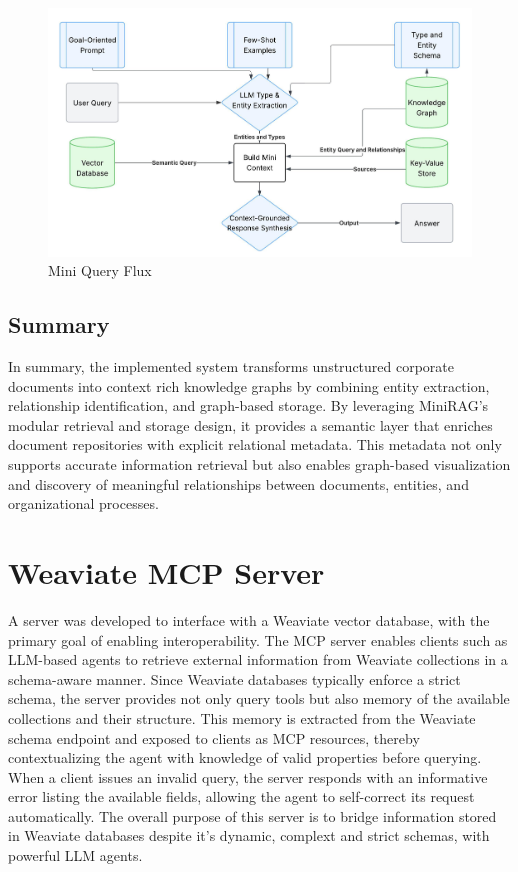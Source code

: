 \begin{figure}
    \centering
    \includegraphics[width=0.75\linewidth]{Images/Fluxograma_Mini_Query.jpeg}
    \caption{Mini Query Flux}
    \label{fig:placeholder}
\end{figure}
\subsection{Summary}

In summary, the implemented system transforms unstructured corporate documents into context rich knowledge graphs by combining entity extraction, relationship identification, and graph-based storage.  
By leveraging MiniRAG’s modular retrieval and storage design, it provides a semantic layer that enriches document repositories with explicit relational metadata.  
This metadata not only supports accurate information retrieval but also enables graph-based visualization and discovery of meaningful relationships between documents, entities, and organizational processes.

\section{Weaviate MCP Server}

A  server was developed to interface with a Weaviate vector database, with the primary goal of enabling interoperability. The MCP server enables clients such as \gls{LLM}-based agents to retrieve external information from Weaviate collections in a schema-aware manner. Since Weaviate databases typically enforce a strict schema, the server provides not only query tools but also memory of the available collections and their structure. This memory is extracted from the Weaviate schema endpoint and exposed to clients as MCP resources, thereby contextualizing the agent with knowledge of valid properties before querying. When a client issues an invalid query, the server responds with an informative error listing the available fields, allowing the agent to self-correct its request automatically. The overall purpose of this server is to bridge information stored in Weaviate databases despite it's dynamic, complext and strict schemas, with powerful \gls{LLM} agents.


